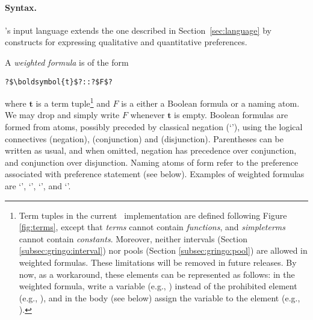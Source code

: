 \paragraph{Syntax.}

\asprin's input language extends the one described in Section~\ref{sec:language} by constructs for expressing qualitative and quantitative preferences.

A \emph{weighted formula} is of the form
\begin{lstlisting}[numbers=none,escapechar=?]
?$\boldsymbol{t}$?::?$F$?
\end{lstlisting}
where $\boldsymbol{t}$ is a term tuple\footnote{%
Term tuples in the current \asprin\ implementation are defined following Figure \ref{fig:terms}, 
except that \emph{terms} cannot contain \emph{functions}, 
and \emph{simpleterms} cannot contain \emph{constants}. 
Moreover, neither intervals (Section \ref{subsec:gringo:interval}) nor pools  (Section \ref{subsec:gringo:pool})
are allowed in weighted formulas. 
These limitations will be removed in future releases. 
By now, as a workaround, these elements can be represented as follows:
in the weighted formula, write a variable (e.g., ) instead of the prohibited element (e.g., ),  
and in the body (see below) assign the variable to the element (e.g., ).
}
and $F$ is a either a Boolean formula or a naming atom.
We may drop \code{::} and simply write $F$ whenever $\boldsymbol{t}$ is empty.
Boolean formulas are formed from atoms, possibly preceded by classical negation (`\code{-}'),
using the logical connectives \code{\texttildelow} (negation), \code{\&} (conjunction) and \code{|} (disjunction).
Parentheses can be written as usual,
and when omitted, negation has precedence over conjunction, and conjunction over disjunction.
%
Naming atoms of form 
refer to the preference associated with preference statement  (see below).
%
Examples of weighted formulas are 
`', 
`', 
`', and 
`'. 

